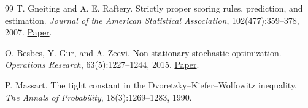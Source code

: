 \documentclass[11pt]{article}
\newcommand{\1}{\mathbf{1}}
\begin{document}
\begin{thebibliography}{99}
T. Gneiting and A. E. Raftery.
\newblock Strictly proper scoring rules, prediction, and estimation.
\newblock \emph{Journal of the American Statistical Association},
102(477):359--378, 2007.
\newblock
\href{https://doi.org/10.1198/016214506000001437}
{Paper}.

O. Besbes, Y. Gur, and A. Zeevi.
\newblock Non-stationary stochastic optimization.
\newblock \emph{Operations Research}, 63(5):1227--1244, 2015.
\newblock
\href{https://doi.org/10.1287/opre.2015.1408}
{Paper}.

P. Massart.
\newblock The tight constant in the Dvoretzky--Kiefer--Wolfowitz inequality.
\newblock \emph{The Annals of Probability}, 18(3):1269--1283, 1990.

\end{thebibliography}
\end{document}
